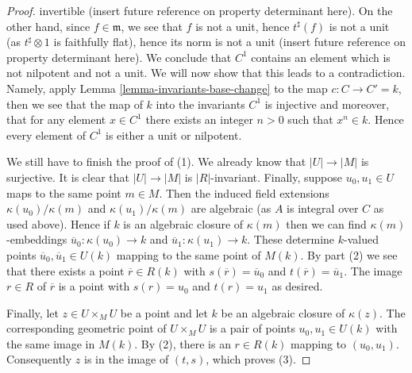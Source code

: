 \begin{proof}
invertible (insert future reference on property determinant here).
On the other hand, since $f \in \mathfrak m$, we see that
$f$ is not a unit, hence $t^\sharp(f)$ is not a unit
(as $t^\sharp \otimes 1$ is faithfully flat),
hence its norm is not a unit (insert future reference
on property determinant here). We conclude that $C^1$ contains
an element which is not nilpotent
and not a unit. We will now show that this leads to a contradiction.
Namely, apply Lemma \ref{lemma-invariants-base-change}
to the map $c : C \to C' = k$, then
we see that the map of $k$ into the invariants $C^1$ is injective
and moreover, that for any element $x \in C^1$ there exists an integer
$n > 0$ such that $x^n \in k$. Hence every element of $C^1$ is
either a unit or nilpotent.

\medskip\noindent
We still have to finish the proof of (1). We already know that
$|U| \to |M|$ is surjective. It is clear that $|U| \to |M|$ is
$|R|$-invariant. Finally, suppose $u_0, u_1 \in U$ maps to the same
point $m \in M$. Then the induced field extensions $\kappa(u_0)/\kappa(m)$
and $\kappa(u_1)/\kappa(m)$ are algebraic (as $A$ is integral over $C$
as used above). Hence if $k$ is an algebraic closure of $\kappa(m)$
then we can find $\kappa(m)$-embeddings $\overline{u}_0 : \kappa(u_0) \to k$
and $\overline{u}_1 : \kappa(u_1) \to k$. These determine $k$-valued
points $\overline{u}_0, \overline{u}_1 \in U(k)$ mapping to the same
point of $M(k)$. By part (2) we see that there exists a point
$\overline{r} \in R(k)$ with $s(\overline{r}) = \overline{u}_0$ and
$t(\overline{r}) = \overline{u}_1$. The image $r \in R$ of $\overline{r}$
is a point with $s(r) = u_0$ and $t(r) = u_1$ as desired.

\medskip\noindent
Finally, let $z \in U \times_M U$ be a point and let $k$ be an algebraic
closure of $\kappa(z)$. The corresponding geometric point of
$U \times_M U$ is a pair of points $u_0, u_1 \in U(k)$ with the same image
in $M(k)$. By (2), there is an $r \in R(k)$ mapping to $(u_0, u_1)$.
Consequently $z$ is in the image of $(t, s)$, which proves (3).
\end{proof}

